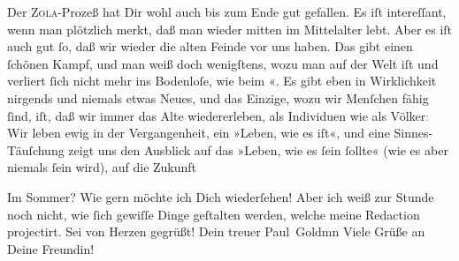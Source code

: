 \pstart
           Der \textsc{Zola}-Prozeß hat Dir wohl auch bis zum Ende gut gefallen. Es iſt intereſſant,  wenn man plötzlich merkt, daß man wieder mitten im
               Mittelalter lebt. Aber es iſt auch gut{ }ſo, daß \strikeout{\textcolor{gray}{w}} wir wieder die alten Feinde vor uns haben.  Das gibt einen{ }ſchönen Kampf, und {\pb}man weiß
               doch wenigſtens, \strikeout{\textcolor{gray}{e}} wozu man auf der Welt iſt und verliert{ }ſich nicht mehr ins Bodenloſe, wie beim
                  \label{K_L02839-9v}\label{K_L02839-9}«. Es gibt eben in Wirklichkeit nirgends  und
               niemals etwas Neues, und das Einzige, wozu wir Menſchen fähig{ }ſind, iſt, daß wir
               immer das Alte wiedererleben, als Individuen wie als Völker\textcolor{gray}{:} Wir
               leben ewig in der Vergangenheit, ein »Leben, wie es iſt«, und eine Sinnes-Täuſchung
               zeigt uns den Ausblick auf das »Leben, wie es{ }ſein{ }ſollte« (wie es aber niemals{ }ſein
               wird),  auf die Zukunft{\dotsfive}\pend
           
\pstart
           Im Sommer? Wie gern möchte ich Dich wiederſehen! Aber ich weiß zur Stunde noch nicht,
               wie{ }ſich gewiſſe Dinge geſtalten werden, welche meine Redaction projectirt. Sei von Herzen
               gegrüßt!\pend
           \pstart Dein treuer \spacefill\mbox{Paul Goldmn}\pend{}
\pstart
           \noindent{}Viele Grüße an Deine Freundin!\pend
           \endnumbering{}  \newcommand{\dateiname}{L02839}\newcommand{\titel}{Paul Goldmann an Arthur Schnitzler, 28. 2. [1898]}\newcommand{\editorInnen}{Martin Anton Müller und Laura Untner}
